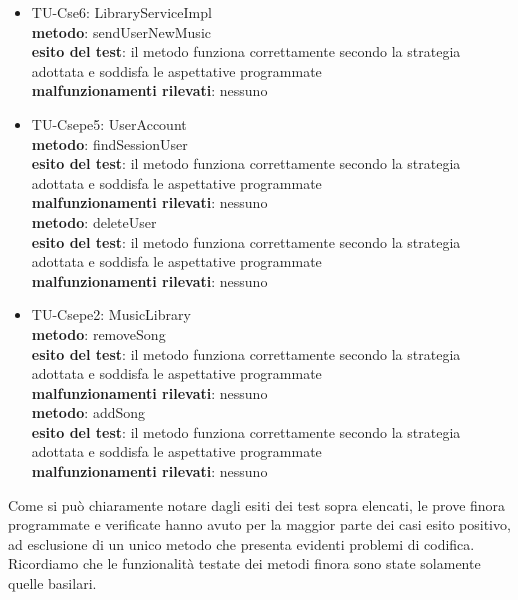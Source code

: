 \begin{itemize}
  \item TU-Cse6: LibraryServiceImpl\\
  \textbf{metodo}: sendUserNewMusic\\
  \textbf{esito del test}: il metodo funziona correttamente secondo la strategia
  adottata e soddisfa le aspettative programmate\\
  \textbf{malfunzionamenti rilevati}: nessuno\\
  
  \item TU-Csepe5: UserAccount\\
  \textbf{metodo}: findSessionUser\\
  \textbf{esito del test}: il metodo funziona correttamente secondo la strategia
  adottata e soddisfa le aspettative programmate\\
  \textbf{malfunzionamenti rilevati}: nessuno\\
  
  \textbf{metodo}: deleteUser\\
  \textbf{esito del test}: il metodo funziona correttamente secondo la strategia
  adottata e soddisfa le aspettative programmate\\
  \textbf{malfunzionamenti rilevati}: nessuno\\
  
  \item TU-Csepe2: MusicLibrary\\
  \textbf{metodo}: removeSong\\
  \textbf{esito del test}: il metodo funziona correttamente secondo la strategia
  adottata e soddisfa le aspettative programmate\\
  \textbf{malfunzionamenti rilevati}: nessuno\\
  
  \textbf{metodo}: addSong\\
  \textbf{esito del test}: il metodo funziona correttamente secondo la strategia
  adottata e soddisfa le aspettative programmate\\
  \textbf{malfunzionamenti rilevati}: nessuno\\
  
\end{itemize}  

Come si pu\`o chiaramente notare dagli esiti dei test sopra elencati, le prove
finora programmate e verificate hanno avuto per la maggior parte dei
casi esito positivo, ad esclusione di un unico metodo che presenta evidenti
problemi di codifica. Ricordiamo che le funzionalit\`a testate dei metodi finora 
sono state solamente quelle basilari.
  
